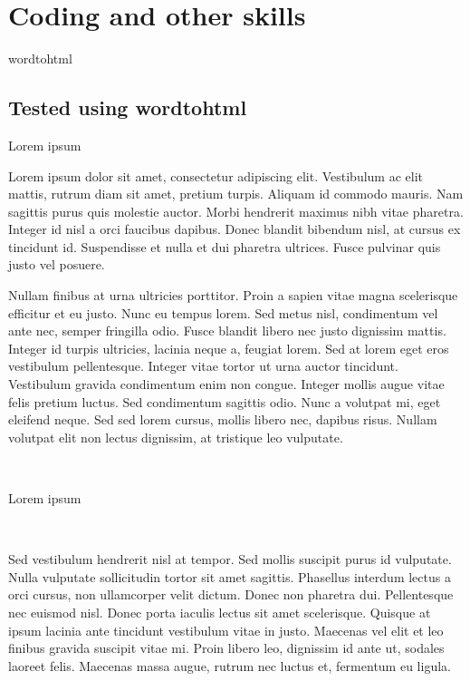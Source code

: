 \documentclass[
]{book}
\begin{document}
\hypertarget{coding-and-other-skills}{%
\chapter{Coding and other skills}\label{coding-and-other-skills}}

wordtohtml

\hypertarget{tested-using-wordtohtml}{%
\section{Tested using wordtohtml}\label{tested-using-wordtohtml}}

Lorem ipsum

Lorem ipsum dolor sit amet, consectetur adipiscing elit. Vestibulum ac elit mattis, rutrum diam sit amet, pretium turpis. Aliquam id commodo mauris. Nam sagittis purus quis molestie auctor. Morbi hendrerit maximus nibh vitae pharetra. Integer id nisl a orci faucibus dapibus. Donec blandit bibendum nisl, at cursus ex tincidunt id. Suspendisse et nulla et dui pharetra ultrices. Fusce pulvinar quis justo vel posuere.

Nullam finibus at urna ultricies porttitor. Proin a sapien vitae magna scelerisque efficitur et eu justo. Nunc eu tempus lorem. Sed metus nisl, condimentum vel ante nec, semper fringilla odio. Fusce blandit libero nec justo dignissim mattis. Integer id turpis ultricies, lacinia neque a, feugiat lorem. Sed at lorem eget eros vestibulum pellentesque. Integer vitae tortor ut urna auctor tincidunt. Vestibulum gravida condimentum enim non congue. Integer mollis augue vitae felis pretium luctus. Sed condimentum sagittis odio. Nunc a volutpat mi, eget eleifend neque. Sed sed lorem cursus, mollis libero nec, dapibus risus. Nullam volutpat elit non lectus dignissim, at tristique leo vulputate.

{~}

{Lorem ipsum}

{~}

Sed vestibulum hendrerit nisl at tempor. Sed mollis suscipit purus id vulputate. Nulla vulputate sollicitudin tortor sit amet sagittis. Phasellus interdum lectus a orci cursus, non ullamcorper velit dictum. Donec non pharetra dui. Pellentesque nec euismod nisl. Donec porta iaculis lectus sit amet scelerisque. Quisque at ipsum lacinia ante tincidunt vestibulum vitae in justo. Maecenas vel elit et leo finibus gravida suscipit vitae mi. Proin libero leo, dignissim id ante ut, sodales laoreet felis. Maecenas massa augue, rutrum nec luctus et, fermentum eu ligula.
\end{document}
